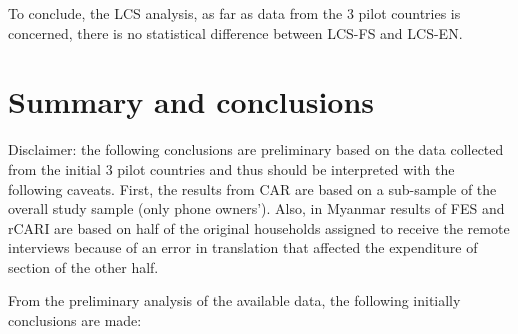 \documentclass[11pt,harvard]{article}
\begin{document}
To conclude, the LCS analysis, as far as data from the 3 pilot countries is concerned, there is no statistical difference between LCS-FS and LCS-EN.


\pagebreak


\section{Summary and conclusions}

Disclaimer: the following conclusions are preliminary based on the data collected from the initial 3 pilot countries and thus should be interpreted with the following caveats. First, the results from CAR are based on a sub-sample of the overall study sample (only phone owners’). Also, in Myanmar results of FES and rCARI are based on half of the original households assigned to receive the remote interviews because of an error in translation that affected the expenditure of section of the other half. 

From the preliminary analysis of the available data, the following initially conclusions are made: 
\end{document}
